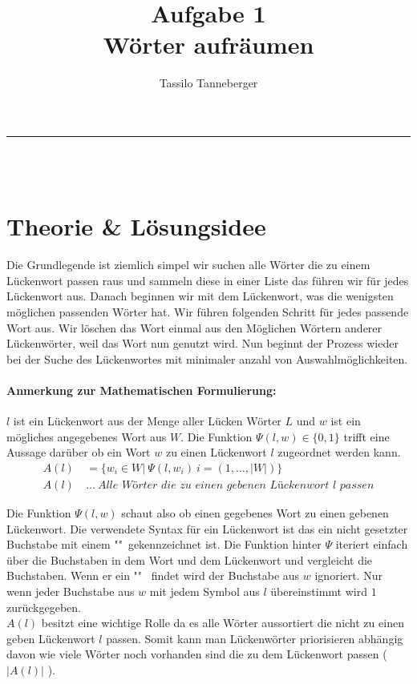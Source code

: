 \documentclass[ngerman,ttfont=true]{tudscrmanual}
\title{Aufgabe 1\\Wörter aufräumen}
\author{Tassilo Tanneberger}
\makeatletter
\newcommand{\linia}{\rule{\linewidth}{1pt}}
\renewcommand{\maketitle}{\begin{center}
\Huge \@title\end{center}
\linia\\
{\large\@author\hfill\@date\\}}
\makeatother
\begin{document}
\maketitle


\section*{Theorie \& Lösungsidee}

Die Grundlegende ist ziemlich simpel wir suchen alle Wörter die zu einem Lückenwort passen raus und sammeln diese in einer Liste das führen wir für jedes Lückenwort aus. Danach beginnen wir mit dem Lückenwort, was die wenigsten möglichen passenden Wörter hat. Wir führen folgenden Schritt für jedes passende Wort aus. Wir löschen das Wort einmal aus den Möglichen Wörtern anderer Lückenwörter, weil das Wort nun genutzt wird. Nun beginnt der Prozess wieder bei der Suche des Lückenwortes mit minimaler anzahl von Auswahlmöglichkeiten.

\paragraph*{Anmerkung zur Mathematischen Formulierung: } $ l $ ist ein Lückenwort aus der Menge aller Lücken Wörter $ L $ und $ w $ ist ein mögliches angegebenes Wort aus $ W $. Die Funktion $ \Psi (l, w) \in \lbrace 0, 1 \rbrace $ trifft eine Aussage darüber ob ein Wort $ w $ zu einen Lückenwort $ l $ zugeordnet werden kann.
\begin{align*}
	A(l) &= \lbrace w_i \in W \vert\ \Psi (l, w_i)\ i = (1, \dots, \vert W \vert ) \rbrace \\
	A(l) \ & \dots \ \textit{Alle Wörter die zu einen gebenen Lückenwort } l \textit{ passen}
\end{align*}

\noindent Die Funktion $ \Psi (l, w) $ schaut also ob einen gegebenes Wort zu einen gebenen Lückenwort. Die verwendete Syntax für ein Lückenwort ist das ein nicht gesetzter Buchstabe mit einem "\textunderscore "\ gekennzeichnet ist. Die Funktion hinter $ \Psi $ iteriert einfach über die Buchstaben in dem Wort und dem Lückenwort und vergleicht die Buchstaben. Wenn er ein "\textunderscore " \ findet wird der Buchstabe aus $ w $ ignoriert. Nur wenn jeder Buchstabe aus $ w $ mit jedem Symbol aus $ l $ übereinstimmt wird $ 1 $ zurückgegeben. \\

\noindent $ A(l) $ besitzt eine wichtige Rolle da es alle Wörter aussortiert die nicht zu einen geben Lückenwort $ l $ passen. Somit kann man Lückenwörter priorisieren abhängig davon wie viele Wörter noch vorhanden sind die zu dem Lückenwort passen ( $ \vert A(l) \vert $ ). \\
\end{document}
